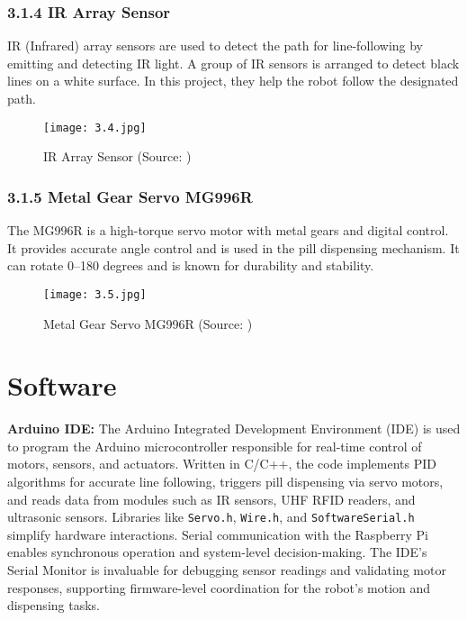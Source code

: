 \subsubsection*{3.1.4 IR Array Sensor}
IR (Infrared) array sensors are used to detect the path for line-following by emitting and detecting IR light. A group of IR sensors is arranged to detect black lines on a white surface. In this project, they help the robot follow the designated path.

\begin{figure}[H]
    \centering
    \texttt{[image: 3.4.jpg]}
    \caption{IR Array Sensor (Source: \cite{10})}
    \label{fig:3.4}
\end{figure}

\subsubsection*{3.1.5 Metal Gear Servo MG996R}
The MG996R is a high-torque servo motor with metal gears and digital control. It provides accurate angle control and is used in the pill dispensing mechanism. It can rotate 0–180 degrees and is known for durability and stability.

\begin{figure}[H]
    \centering
    \texttt{[image: 3.5.jpg]}
    \caption{Metal Gear Servo MG996R (Source: \cite{11})}
    \label{fig:3.5}
\end{figure}
\section{Software}

\textbf{Arduino IDE:} The Arduino Integrated Development Environment (IDE) is used to program the Arduino microcontroller responsible for real-time control of motors, sensors, and actuators. Written in C/C++, the code implements PID algorithms for accurate line following, triggers pill dispensing via servo motors, and reads data from modules such as IR sensors, UHF RFID readers, and ultrasonic sensors. Libraries like \texttt{Servo.h}, \texttt{Wire.h}, and \texttt{SoftwareSerial.h} simplify hardware interactions. Serial communication with the Raspberry Pi enables synchronous operation and system-level decision-making. The IDE’s Serial Monitor is invaluable for debugging sensor readings and validating motor responses, supporting firmware-level coordination for the robot’s motion and dispensing tasks.

\vspace{0.5em}

